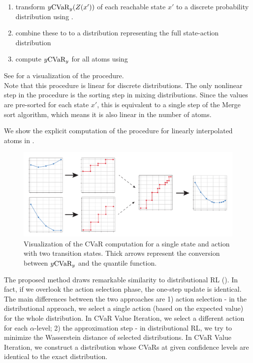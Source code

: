\begin{enumerate}
\item transform $y \text{CVaR}_y(Z(x'))$ of each reachable state $x'$ to a discrete probability distribution using .
\item combine these to to a distribution representing the full state-action distribution
\item compute $y \text{CVaR}_y$ for all atoms using 
\end{enumerate}
See  for a visualization of the procedure. 
\\
Note that this procedure is linear for discrete distributions. The only nonlinear step in the procedure is the sorting step in mixing distributions. Since the values are pre-sorted for each state $x'$, this is equivalent to a single step of the Merge sort algorithm, which means it is also linear in the number of atoms.

We show the explicit computation of the procedure for linearly interpolated atoms in .


\begin{figure}
\center
\includegraphics[width=\linewidth]{gfx/cvar_vi_conversion.pdf}
\caption[Faster CVaR computation.]{Visualization of the CVaR computation for a single state and action with two transition states. Thick arrows represent the conversion between $y\text{CVaR}_y$ and the quantile function.}
\label{fig:cvarcomputation}
\end{figure}

The proposed method draws remarkable similarity to distributional RL (). In fact, if we overlook the action selection phase, the one-step update is identical. The main differences between the two approaches are 1) action selection - in the distributional approach, we select a single action (based on the expected value) for the whole distribution. In CVaR Value Iteration, we select a different action for each $\alpha$-level; 2) the approximation step - in distributional RL, we try to minimize the Wasserstein distance of selected distributions. In CVaR Value Iteration, we construct a distribution whose CVaRs at given confidence levels are identical to the exact distribution.


